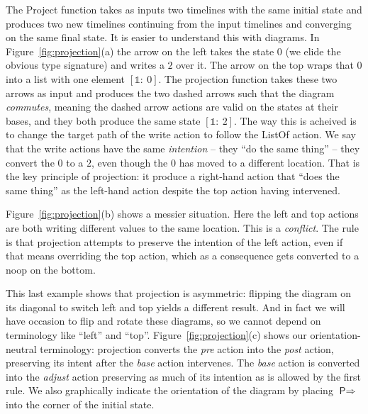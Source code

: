 \documentclass[english,submission]{programming}
\theoremstyle{definition}
\newcommand{\is}{{:}\ }
\begin{document}
The \textsf{Project} function takes as inputs two timelines with the same initial state and produces two new timelines continuing from the input timelines and converging on the same final state. It is easier to understand this with diagrams.
In Figure~\ref{fig:projection}(a) the arrow on the left takes the state $0$ (we elide the obvious type signature) and writes a $2$ over it. The arrow on the top wraps that $0$ into a list with one element $[\mathbb{1}\is 0]$. The projection function takes these two arrows as input and produces the two dashed arrows such that the diagram \textit{commutes}, meaning the dashed arrow actions are valid on the states at their bases, and they both produce the same state $[\mathbb{1}\is 2]$. The way this is acheived is to change the target path of the \textsf{write} action to follow the \textsf{ListOf} action. We say that the \textsf{write} actions have the same \textit{intention} -- they ``do the same thing'' -- they convert the $0$ to a $2$, even though the $0$ has moved to a different location. That is the key principle of projection: it produce a right-hand action that ``does the same thing'' as the left-hand action despite the top action having intervened.

Figure~\ref{fig:projection}(b) shows a messier situation. Here the left and top actions are both writing different values to the same location. This is a \textit{conflict}. The rule is that projection attempts to preserve the intention of the left action, even if that means overriding the top action, which as a consequence gets converted to a \textsf{noop} on the bottom.

This last example shows that projection is asymmetric: flipping the diagram on its diagonal to switch left and top yields a different result. And in fact we will have occasion to flip and rotate these diagrams, so we cannot depend on terminology like ``left'' and ``top''. Figure~\ref{fig:projection}(c) shows our orientation-neutral terminology: projection converts the \textit{pre} action into the \textit{post} action, preserving its intent after the \textit{base} action intervenes. The \textit{base} action is converted into the \textit{adjust} action preserving as much of its intention as is allowed by the first rule. We also graphically indicate the orientation of the diagram by placing $\textsf{P}\!\Rightarrow$ into the corner of the initial state.
\end{document}
